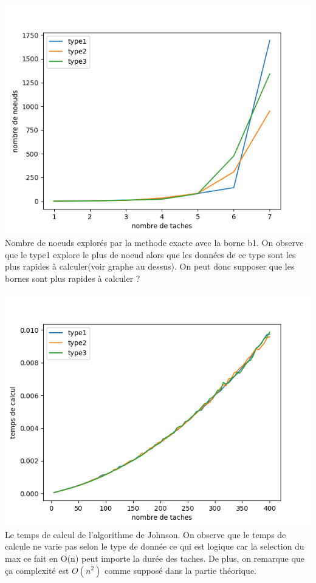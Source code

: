\documentclass[a4paper, 10pt]{article}
\begin{document}
                \paragraph{}{
                  \includegraphics{graphes/node_b1.png}
                  Nombre de noeuds explorés par la methode exacte avec la borne b1. On observe que le type1 explore le plus de noeud alors que les données de ce type sont les plus rapides à calculer(voir graphe au dessus).
                  On peut donc supposer que les bornes sont plus rapides à calculer ?
                }

                \paragraph{}{
                  \includegraphics{graphes/Johnson.png}
                  Le temps de calcul de l'algorithme de Johnson. On observe que le temps de calcule ne varie pas selon le type de donnée ce qui est logique car la selection du max ce fait en O(n) peut importe la durée des taches. De plus, on remarque que ça complexité est $O(n^2)$ comme supposé dans la partie théorique.
                }
\end{document}

